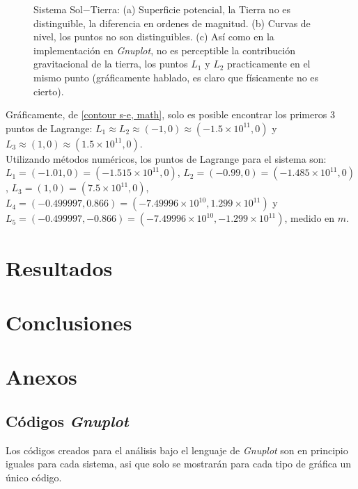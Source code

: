 \begin{figure}[H]
\caption{Sistema Sol$-$Tierra: (a) Superficie potencial, la Tierra no es distinguible, la diferencia en ordenes de magnitud. (b) Curvas de nivel, los puntos no son distinguibles. (c) Así como en la implementación en \textit{Gnuplot}, no es perceptible la contribución gravitacional de la tierra, los puntos $L_1$ y $L_2$ practicamente en el mismo punto (gráficamente hablado, es claro que físicamente no es cierto).}
\label{superficie, cn s-e, math}
\end{figure}

Gráficamente, de \ref{contour s-e, math}, solo es posible encontrar los primeros $3$ puntos de Lagrange: $L_1 \approx L_2 \approx (-1,0) \approx (-1.5\times 10^{11},0)$ y $L_3 \approx (1,0) \approx (1.5\times 10^{11},0)$. \\

Utilizando métodos numéricos, los puntos de Lagrange para el sistema son: $L_1 = (-1.01, 0) = (-1.515\times 10^{11} ,0)$, $L_2 = (-0.99, 0) = (-1.485\times 10^{11} ,0)$, $L_3 = (1,0) = (7.5\times 10^{11} ,0)$, $L_4 = (-0.499997, 0.866) = (-7.49996\times 10^{10} ,1.299\times 10^{11})$ y $L_5 = (-0.499997,-0.866) = (-7.49996\times 10^{10} ,-1.299\times 10^{11})$, medido en $m$.





\section{Resultados}
\label{sec:resultados}






\section{Conclusiones}
\label{sec:conclusiones}

\lipsum[1]


\section{Anexos}
\label{sec:anexos}

\subsection{Códigos \textit{Gnuplot}}
Los códigos creados para el análisis bajo el lenguaje de \textit{Gnuplot} son en principio iguales para cada sistema, asi que solo se mostrarán para cada tipo de gráfica un único código.

